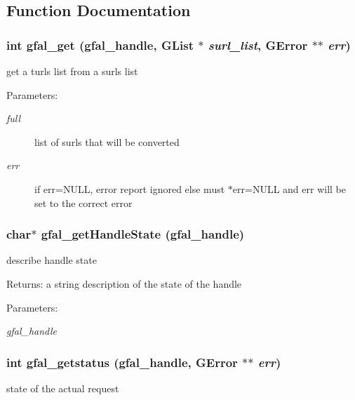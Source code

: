\subsection{Function Documentation}
\subsubsection{\setlength{\rightskip}{0pt plus 5cm}int gfal\_\-get (gfal\_\-handle, GList $\ast$ {\em surl\_\-list}, GError $\ast$$\ast$ {\em err})}\label{group__srm__group_g72241d4a54f2d555838376723c4fe106}


get a turls list from a surls list 

\begin{Desc}
\item[Parameters:]
\begin{description}
\item[{\em full}]list of surls that will be converted \item[{\em err}]if err=NULL, error report ignored else must $\ast$err=NULL and err will be set to the correct error \end{description}
\end{Desc}
\subsubsection{\setlength{\rightskip}{0pt plus 5cm}char$\ast$ gfal\_\-get\-Handle\-State (gfal\_\-handle)}\label{group__srm__group_gb850010181be27c87a5c5b0341412655}


describe handle state 

\begin{Desc}
\item[Returns:]a string description of the state of the handle \end{Desc}
\begin{Desc}
\item[Parameters:]
\begin{description}
\item[{\em gfal\_\-handle}]\end{description}
\end{Desc}
\subsubsection{\setlength{\rightskip}{0pt plus 5cm}int gfal\_\-getstatus (gfal\_\-handle, GError $\ast$$\ast$ {\em err})}\label{group__srm__group_g0de517db68fac8b99b6e4cf3ab413485}


state of the actual request 